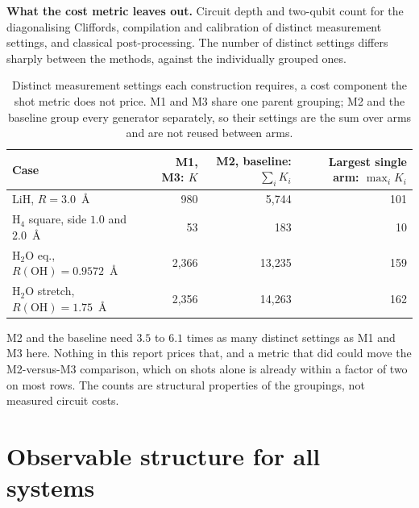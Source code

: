 \documentclass[10pt]{article}
\begin{document}
\textbf{What the cost metric leaves out.} Circuit depth and two-qubit count for
the diagonalising Cliffords, compilation and calibration of distinct measurement
settings, and classical post-processing. The number of distinct settings differs
sharply between the methods, against the individually grouped ones.

\begin{table}[!htbp]
\centering
\scriptsize
\caption{Distinct measurement settings each construction requires, a cost component the shot metric does not price. M1 and M3 share one parent grouping; M2 and the baseline group every generator separately, so their settings are the sum over arms and are not reused between arms.}
\label{tab:settings}
\begin{tabular}{lrrr}
\toprule
Case & M1, M3: $K$ & M2, baseline: $\sum_i K_i$ & Largest single arm: $\max_i K_i$ \\
\midrule
LiH, $R=3.0$~\si{\angstrom} & 980 & 5,744 & 101 \\
H$_4$ square, side $1.0$ and $2.0$~\si{\angstrom} & 53 & 183 & 10 \\
H$_2$O eq., $R(\mathrm{OH})=0.9572$~\si{\angstrom} & 2,366 & 13,235 & 159 \\
H$_2$O stretch, $R(\mathrm{OH})=1.75$~\si{\angstrom} & 2,356 & 14,263 & 162 \\
\bottomrule
\end{tabular}
\end{table}

M2 and the baseline need $3.5$ to $6.1$ times as many distinct settings as M1 and M3 here. Nothing in this report prices that, and a metric that did could move the M2-versus-M3 comparison, which on shots alone is already within a factor of two on most rows. The counts are structural properties of the groupings, not measured circuit costs.

\section{Observable structure for all systems}
\label{sec:structure}
\end{document}
